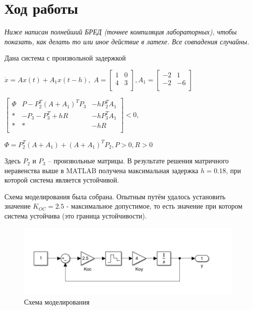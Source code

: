 \section{Ход работы}

\textit{Ниже написан полнейший БРЕД (точнее компиляция лабораторных), чтобы показать, как делать то или иное действие в латехе. Все совпадения случайны.}

Дана система с произвольной задержкой

$\dot{x} = Ax(t) + A_1 x (t-h), $
$A = 
\begin{bmatrix}
1 &  0\\
4 & 3\\
\end{bmatrix},
A_1 = 
\begin{bmatrix}
-2 & 1 \\
-2 & -6\\
\end{bmatrix}$

$\begin{bmatrix}
\Phi & P - P_2^T (A+A_1)^T P_3 & -h P_2^T A_1\\
* & -P_3 - P_3^T + hR & -h P_3^T A_1\\
* & * & -hR\\
\end{bmatrix} < 0,
$

$\Phi = P_2^T (A+A_1) + (A+A_1)^T P_2, P > 0, R > 0$

Здесь $P_2$ и $P_3$ – произвольные матрицы. В результате решения матричного неравенства выше в MATLAB получена максимальная задержка $h = 0.18$, при которой система является устойчивой. 

Схема моделирования была собрана. Опытным путём удалось установить значение $K_{OC} = 2.5$ - максимальное допустимое, то есть значение при котором система устойчива (это граница устойчивости).

\begin{figure}[H]
    \centering
\includegraphics[width=1.\linewidth,center]{assets/images/1.png}
    \caption{Схема моделирования}
    \label{fig:p1}
\end{figure}

